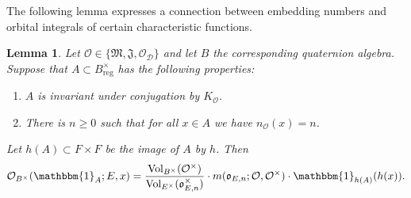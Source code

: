 \documentclass{article}
\newtheorem{lem}{Lemma}[section]
\theoremstyle{named}
\newcommand{\D}{\mathcal{D}}
\newcommand{\M}{\mathfrak{M}}
\newcommand{\J}{\mathfrak{J}}
\renewcommand{\O}{\mathcal{O}}
\renewcommand{\o}{\mathfrak{o}}
\DeclareMathOperator{\vol}{Vol}
\DeclareMathOperator{\reg}{reg}
\begin{document}
The following lemma expresses a connection between embedding numbers and orbital integrals of certain characteristic functions.
\begin{lem}\label{lem:orbitalintegralOnadapted}
Let $\O \in \{\M, \J, \O_\D\}$ and let $B$ the corresponding quaternion algebra. Suppose that $A \subset B_{\reg}^\times$ has the following properties:
\begin{enumerate}
    \item [i)] $A$ is invariant under conjugation by $K_\O$.
    \item [ii)] There is $n \geq 0$ such that for all $x\in A$ we have $n_\O(x) = n$.
\end{enumerate}
Let $h(A) \subset F\times F$ be the image of $A$ by $h$. Then 
\begin{equation*}
    \O_{B^\times}(\mathbbm{1}_A; E, x) = \frac{\vol_{B^\times}(\O^\times)}{\vol_{E^\times}(\o_{E, n}^\times)}\cdot m(\o_{E, n}; \O, \O^\times) \cdot \mathbbm{1}_{h(A)}(h(x)).
\end{equation*}
\end{lem}
\end{document}
